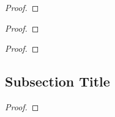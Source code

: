 \begin{exmp}
    \lipsum[1]
\end{exmp}

\begin{exmp}
    \lipsum[1]
\end{exmp}

\begin{lemm}
    \lipsum[1]
\end{lemm}

\begin{proof}
    \lipsum[1]
\end{proof}

\begin{exmp}
    \lipsum[1]
\end{exmp}

\begin{thrm}
    \lipsum[1]
\end{thrm}

\begin{proof}
    \lipsum[1]
\end{proof}

\begin{coro}
    \lipsum[1]
\end{coro}

\begin{proof}
    \lipsum[1]
\end{proof}

\subsection{Subsection Title}

\begin{defn}
    \lipsum[1]
\end{defn}

\begin{exmp}
    \lipsum[1]
\end{exmp}

\begin{lemm}
    \lipsum[1]
\end{lemm}

\begin{proof}
    \lipsum[1]
\end{proof}

\begin{exmp}
    \lipsum[1]
\end{exmp}

\begin{thrm}
    \lipsum[1]
\end{thrm}

